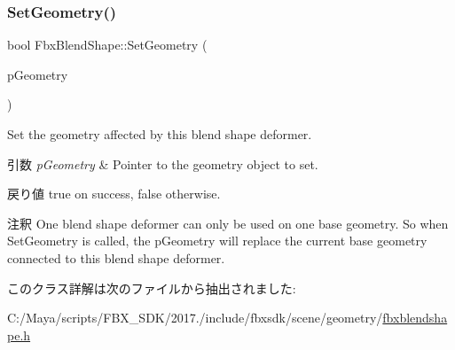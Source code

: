 \subsubsection{\texorpdfstring{Set\+Geometry()}{SetGeometry()}}
{\footnotesize\ttfamily bool Fbx\+Blend\+Shape\+::\+Set\+Geometry (\begin{DoxyParamCaption}\item[{\hyperlink{class_fbx_geometry}{Fbx\+Geometry} $\ast$}]{p\+Geometry }\end{DoxyParamCaption})}

Set the geometry affected by this blend shape deformer. 
\begin{DoxyParams}{引数}
{\em p\+Geometry} & Pointer to the geometry object to set. \\
\hline
\end{DoxyParams}
\begin{DoxyReturn}{戻り値}
{\ttfamily true} on success, {\ttfamily false} otherwise. 
\end{DoxyReturn}
\begin{DoxyRemark}{注釈}
One blend shape deformer can only be used on one base geometry. So when Set\+Geometry is called, the p\+Geometry will replace the current base geometry connected to this blend shape deformer. 
\end{DoxyRemark}


このクラス詳解は次のファイルから抽出されました\+:\begin{DoxyCompactItemize}
\item 
C\+:/\+Maya/scripts/\+F\+B\+X\+\_\+\+S\+D\+K/2017./include/fbxsdk/scene/geometry/\hyperlink{fbxblendshape_8h}{fbxblendshape.\+h}\end{DoxyCompactItemize}
